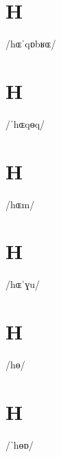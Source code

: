 \documentclass[10pt,a4paper,twoside]{book}
\begin{document}
\section*{H}

\begin{multicols}{3}
 {/hɶˈqɒbʁɶ/} {}
\end{multicols}

\section*{H}

\begin{multicols}{3}
 {/ˈhɶqɵq/} {}
\end{multicols}

\section*{H}

\begin{multicols}{3}
 {/hɶm/} {}
\end{multicols}

\section*{H}

\begin{multicols}{3}
 {/hɶˈɣu/} {}
\end{multicols}

\section*{H}

\begin{multicols}{3}
 {/hɵ/} {}
\end{multicols}

\section*{H}

\begin{multicols}{3}
 {/ˈhɵɒ/} {}
\end{multicols}
\end{document}
